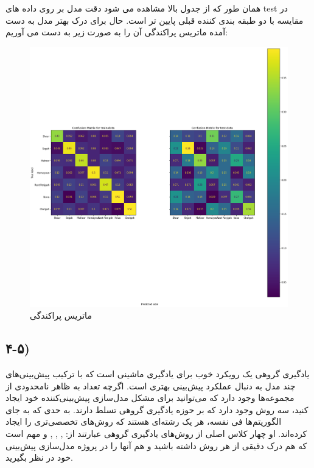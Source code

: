 \documentclass{article}
\begin{document}
همان طور که از جدول بالا مشاهده می شود دقت مدل  بر روی داده های test در مقایسه با دو طبقه بندی کننده قبلی پایین تر است.\newline
حال برای درک بهتر مدل به دست آمده  ماتریس پراکندگی آن را به صورت زیر به دست می آوریم:
\begin{figure}[h]
	\centering
	\includegraphics[width=0.7\linewidth]{Photo/23}
	\caption[ماتریس پراکندگی  ]{ماتریس پراکندگی  }
	\label{fig:23}
\end{figure}

\subsection{۴-۵) }
یادگیری گروهی  یک رویکرد خوب برای یادگیری ماشینی است که با ترکیب پیش‌بینی‌های چند مدل به دنبال عملکرد پیش‌بینی بهتری است.\newline
اگرچه تعداد به ظاهر نامحدودی از مجموعه‌ها وجود دارد که می‌توانید برای مشکل مدل‌سازی پیش‌بینی‌کننده خود ایجاد کنید، سه روش وجود دارد که بر حوزه یادگیری گروهی  تسلط دارند. به حدی که به جای الگوریتم‌ها فی نفسه، هر یک رشته‌ای هستند که روش‌های تخصصی‌تری را ایجاد کرده‌اند.\newline
او چهار کلاس اصلی از روش‌های یادگیری گروهی عبارتند از: , , , و مهم است که هم درک دقیقی از هر روش داشته باشید و هم آنها را در پروژه مدل‌سازی پیش‌بینی خود در نظر بگیرید.\newline
\end{document}
